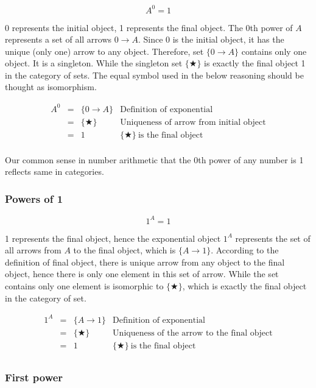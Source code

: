 \documentclass[b5paper]{article}
\begin{document}
\[
  A^0 = 1
\]

0 represents the initial object, 1 represents the final object. The 0th power of $A$ represents a set of all arrows $0 \to A$. Since 0 is the initial object, it has the unique (only one) arrow to any object. Therefore, set $\{ 0 \to A \}$ contains only one object. It is a singleton. While the singleton set $\{ \bigstar \}$ is exactly the final object 1 in the category of sets. The equal symbol used in the below reasoning should be thought as isomorphism.

\[
\begin{array}{rcll}
A^0 & = & \{ 0 \to A \} & \text{Definition of exponential} \\
    & = & \{ \bigstar \} & \text{Uniqueness of arrow from initial object} \\
    & = & 1 & \{ \bigstar \}\ \text{is the final object} \\
\end{array}
\]

Our common sense in number arithmetic that the 0th power of any number is 1 reflects same in categories.

\subsubsection{Powers of 1}

\[
  1^A = 1
\]

1 represents the final object, hence the exponential object $1^A$ represents the set of all arrows from $A$ to the final object, which is $\{ A \to 1 \}$. According to the definition of final object, there is unique arrow from any object to the final object, hence there is only one element in this set of arrow. While the set contains only one element is isomorphic to $\{ \bigstar \}$, which is exactly the final object in the category of set.

\[
\begin{array}{rcll}
1^A & = & \{ A \to 1 \} & \text{Definition of exponential} \\
    & = & \{ \bigstar \} & \text{Uniqueness of the arrow to the final object} \\
    & = & 1 & \{ \bigstar \}\ \text{is the final object} \\
\end{array}
\]

\subsubsection{First power}
\end{document}
